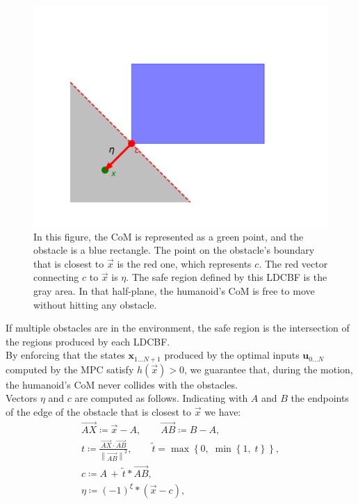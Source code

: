 \begin{figure}[h]
    \centering
    \includegraphics[width=0.75\linewidth]{figures//MPC/example_lcbf.pdf}
    \caption{In this figure, the CoM is represented as a green point, and the obstacle is a blue rectangle. The point on the obstacle's boundary that is closest to $\vec{x}$ is the red one, which represents $c$. The red vector connecting $c$ to $\vec{x}$ is $\eta$. The safe region defined by this LDCBF is the gray area. In that half-plane, the humanoid's CoM is free to move without hitting any obstacle.}
    \label{fig:example_LDCBF}
\end{figure}

If multiple obstacles are in the environment, the safe region is the intersection of the regions produced by each LDCBF.\\
By enforcing that the states $\mathbf{x}_{1...N+1}$ produced by the optimal inputs $\mathbf{u}_{0...N}$ computed by the MPC satisfy $h(\vec{x})>0$, we guarantee that, during the motion, the humanoid's CoM never collides with the obstacles.\\

Vectors $\eta$ and $c$ are computed as follows. Indicating with $A$ and $B$ the endpoints of the edge of the obstacle that is closest to $\vec{x}$ we have:
\begin{gather*}
    \overrightarrow{AX} \coloneqq \vec{x} - A, \qquad \overrightarrow{AB} \coloneqq B - A, \\
    t \coloneqq \frac{\overrightarrow{AX} \cdot \overrightarrow{AB}}{\left\lVert \overrightarrow{AB} \right\rVert ^2}, \qquad \tilde{t} = \max \left\{0,\; \min \left\{ 1,\; t\right\}\right\}, \\
    c \coloneqq A\, +\, \tilde{t}*\overrightarrow{AB}, \\
    \eta \coloneqq \left(-1\right)^{\xi} * \left( \vec{x} - c \right),
\end{gather*}

